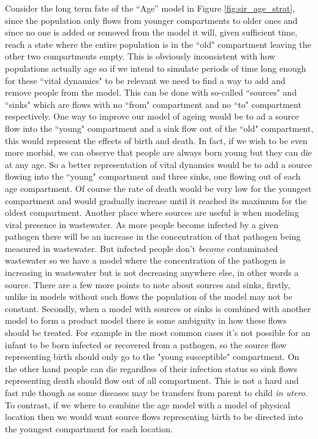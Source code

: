 Consider the long term fate of the ``Age'' model in Figure \ref{fig:sir_age_strat}, since the population only flows from younger compartments to older ones and since no one is added or removed from the model it will, given sufficient time, reach a state where the entire population is in the ``old" compartment leaving the other two compartments empty. This is obviously inconsistent with how populations actually age so if we intend to simulate periods of time long enough for these ``vital dynamics" to be relevant we need to find a way to add and remove people from the model. This can be done with so-called ``sources" and ``sinks" which are flows with no ``from" compartment and no ``to" compartment respectively. One way to improve our model of ageing would be to ad a source flow into the ``young" compartment and a sink flow out of the ``old" compartment, this would represent the effects of birth and death. In fact, if we wish to be even more morbid, we can observe that people are always born young but they can die at any age. So a better representation of vital dynamics would be to add a source flowing into the ``young" compartment and three sinks, one flowing out of each age compartment. Of course the rate of death would be very low for the youngest compartment and would gradually increase until it reached its maximum for the oldest compartment. Another place where sources are useful is when modeling viral presence in wastewater. As more people become infected by a given pathogen there will be an increase in the concentration of that pathogen being measured in wastewater.  But infected people don't \emph{become} contaminated wastewater so we have a model where the concentration of the pathogen is increasing in wastewater but is not decreasing anywhere else, in other words a source.  There are a few more points to note about sources and sinks, firstly, unlike in models without such flows the population of the model may not be constant. Secondly, when a model with sources or sinks is combined with another model to form a product model there is some ambiguity in how these flows should be treated. For example in the most common cases it's not possible for an infant to be born infected or recovered from a pathogen, so the source flow representing birth should only go to the "young susceptible" compartment. On the other hand people can die regardless of their infection status so sink flows representing death should flow out of all compartment. This is not a hard and fast rule though as some diseases may be transfers from parent to child \emph{in utero}. To contrast, if we where to combine the age model with a model of physical location then we would want source flows representing birth to be directed into the youngest compartment for each location.

